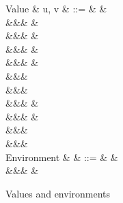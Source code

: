 \begin{figure}
\begin{syntaxfig}
\mbox{Value}
&
u, v
&
::=
&
\bot
&
\\
&&&
\exTrue \mid \exFalse
&
\\
&&&
&
\\
&&&
&
\\
&&&
&
\\
&&&
\\
&&&
\\
&&&
\exNil
&
\\
&&&
&
\\
&&&
\\
&&&
\\[2mm]
\mbox{Environment}
&
\rho
&
::=
&
\envEmpty
&
\\
&&&
&
\end{syntaxfig}
\caption{Values and environments}
\end{figure}
